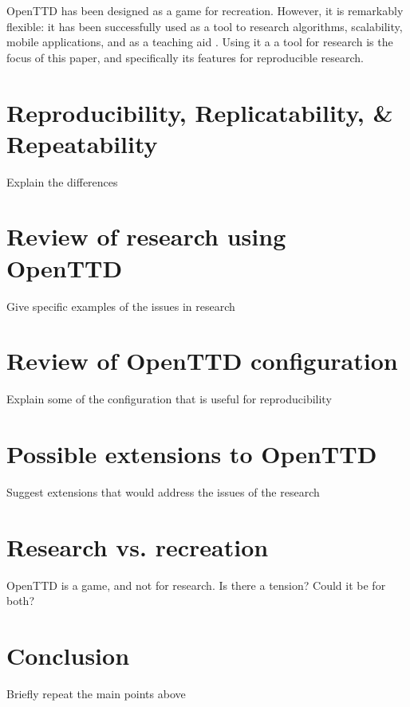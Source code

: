 \documentclass[twocolumn]{article}
\begin{document}
OpenTTD has been designed as a game for recreation. However, it is remarkably flexible: it has been successfully used as a tool to research algorithms, scalability, mobile applications, and as a teaching aid \cite{HansenMuprhie2018}. Using it a a tool for research is the focus of this paper, and specifically its features for reproducible research.

\section{Reproducibility, Replicatability, \& Repeatability}
\begin{YStkyNote}[TODO]
Explain the differences
\end{YStkyNote}

\section{Review of research using OpenTTD}

\begin{YStkyNote}[TODO]
Give specific examples of the issues in research
\end{YStkyNote}

\section{Review of OpenTTD configuration}

\begin{YStkyNote}[TODO]
Explain some of the configuration that is useful for reproducibility
\end{YStkyNote}

\section{Possible extensions to OpenTTD}

\begin{YStkyNote}[TODO]
Suggest extensions that would address the issues of the research
\end{YStkyNote}

\section{Research vs. recreation}

\begin{YStkyNote}[TODO]
OpenTTD is a game, and not for research. Is there a tension? Could it be for both?
\end{YStkyNote}

\section{Conclusion}

\begin{YStkyNote}[TODO]
Briefly repeat the main points above
\end{YStkyNote}

\normalsize


\end{document}
